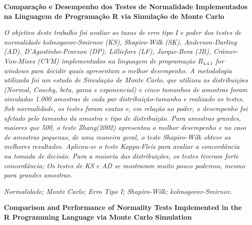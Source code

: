 \documentclass[a4paper,11pt]{article} %
\begin{document}
\pagestyle{fancy}
\setcounter{page}{1}
\renewcommand{\thefootnote}{$\dagger$}
\lfoot{}
\rfoot{}
\setpagewiselinenumbers
\modulolinenumbers[1]
\linenumbers

\begin{center}
    {\large {\bf Comparação e Desempenho dos Testes de Normalidade Implementados na Linguagem de Programação R via Simulação de Monte Carlo}}\vspace{0.3cm}
\end{center}

\begin{small}

 {\it 
    O objetivo deste trabalho foi avaliar as taxas de erro tipo I e poder dos testes de normalidade kolmogorov-Smirnov (KS), Shapiro-Wilk (SK), Anderson-Darling (AD), D’Agostinho-Pearson (DP), Lilliefors (LF), Jarque-Bera (JB), Crámer-Von-Mises (CVM) implementados na linguagem de programação $R_{4.4.1}$ for windows para decidir quais apresentam o melhor desempenho. A metodologia utilizada foi um estudo de Simulação de Monte Carlo, que utilizou as distribuições (Normal, Couchy, beta, gama e exponencial) e cinco tamanhos de amostras foram simuladas 1.000 amostras de cada par distribuição-tamanho e realizado os testes. Sob normalidade, os testes foram exatos e, em relação ao poder, o desempenho foi afetado pelo tamanho da amostra e tipo de distribuição. Para amostras grandes, maiores que 500, o teste \textit{Zhang(2002)} apresentou o melhor desempenho e no caso de amostras pequenas, de uma maneira geral, o teste Shapiro-Wilk obteve os melhores resultados. Aplicou-se o teste Kappa-Fleis para avaliar a concordância na tomada de decisão. Para a maioria das distribuições, os testes tiveram forte concordância; Os testes de KS e AD se mostraram muito pouco poderoso, mesmo para grandes amostras.}\vspace{0.3cm}

 {\it Normalidade; Monte Carlo; Erro Tipo I; Shapiro-Wilk; kolmogorov-Smirnov.}\vspace{0.3cm}

\end{small}

\begin{center}
    {\large {\bf Comparison and Performance of Normality Tests Implemented in the R Programming Language via Monte Carlo Simulation}\vspace{0.3cm}}
\end{center}
\end{document}

